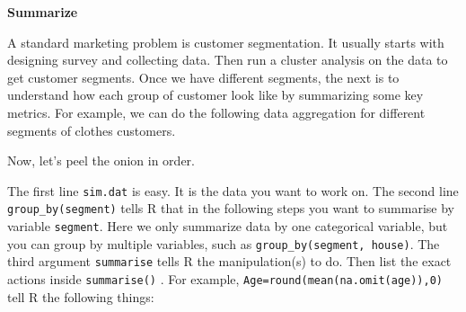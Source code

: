 \documentclass[12pt,]{krantz}
\makeatletter
\newenvironment{Shaded}{\begin{snugshade}}{\end{snugshade}}
\newcommand{\KeywordTok}[1]{\textcolor[rgb]{0.27,0.27,0.27}{\textbf{#1}}}
\newcommand{\DataTypeTok}[1]{\textcolor[rgb]{0.27,0.27,0.27}{#1}}
\newcommand{\DecValTok}[1]{\textcolor[rgb]{0.06,0.06,0.06}{#1}}
\newcommand{\FloatTok}[1]{\textcolor[rgb]{0.06,0.06,0.06}{#1}}
\newcommand{\StringTok}[1]{\textcolor[rgb]{0.5,0.5,0.5}{#1}}
\newcommand{\OperatorTok}[1]{\textcolor[rgb]{0.43,0.43,0.43}{\textbf{#1}}}
\newcommand{\NormalTok}[1]{#1}
\newenvironment{kframe}{%
\medskip{}
\setlength{\fboxsep}{.8em}
 \def\at@end@of@kframe{}%
 \ifinner\ifhmode%
  \def\at@end@of@kframe{\end{minipage}}%
  \begin{minipage}{\columnwidth}%
 \fi\fi%
 \def\FrameCommand##1{\hskip\@totalleftmargin \hskip-\fboxsep
 \colorbox{shadecolor}{##1}\hskip-\fboxsep
     \hskip-\linewidth \hskip-\@totalleftmargin \hskip\columnwidth}%
 \MakeFramed {\advance\hsize-\width
   \@totalleftmargin\z@ \linewidth\hsize
   \@setminipage}}%
 {\par\unskip\endMakeFramed%
 \at@end@of@kframe}
\renewenvironment{Shaded}{\begin{kframe}}{\end{kframe}}
\theoremstyle{definition}
\theoremstyle{definition}
\theoremstyle{definition}
\theoremstyle{remark}
\makeatother
\begin{document}
\textbf{Summarize}

A standard marketing problem is customer segmentation. It usually starts
with designing survey and collecting data. Then run a cluster analysis
on the data to get customer segments. Once we have different segments,
the next is to understand how each group of customer look like by
summarizing some key metrics. For example, we can do the following data
aggregation for different segments of clothes customers.

\begin{Shaded}
\end{Shaded}

Now, let's peel the onion in order.

The first line \texttt{sim.dat} is easy. It is the data you want to work
on. The second line \texttt{group\_by(segment)} tells R that in the
following steps you want to summarise by variable \texttt{segment}. Here
we only summarize data by one categorical variable, but you can group by
multiple variables, such as \texttt{group\_by(segment,\ house)}. The
third argument \texttt{summarise} tells R the manipulation(s) to do.
Then list the exact actions inside \texttt{summarise()} . For example,
\texttt{Age=round(mean(na.omit(age)),0)} tell R the following things:
\end{document}

